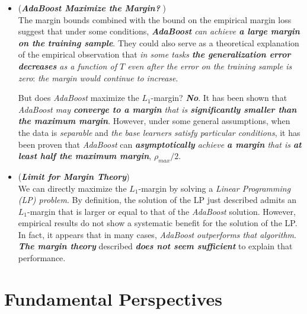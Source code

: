 \documentclass[11pt]{article}
\begin{document}
\begin{itemize}
\item \begin{remark} (\emph{\textbf{AdaBoost Maximize the Margin? }})\\
The margin bounds combined with the bound on the empirical margin loss suggest that under some conditions, \emph{\textbf{AdaBoost} can achieve \textbf{a large margin on the training sample}}. They could also serve as a theoretical explanation of the empirical observation that \emph{in some tasks \textbf{the generalization error decreases} as a function of $T$ even after the error on the training sample is zero}: \emph{the margin would continue to increase}. 

But does \emph{AdaBoost} maximize the $L_1$-margin? \emph{\textbf{No}}. It has been shown that \emph{AdaBoost may \textbf{converge to a margin} that is \textbf{significantly smaller than the maximum margin}}. However, under some general assumptions, when the data is \emph{separable} and \emph{the base learners satisfy particular conditions}, it has been proven that \emph{AdaBoost} can \emph{\textbf{asymptotically} achieve \textbf{a margin} that is \textbf{at least half the maximum margin}}, $\rho_{max}/2$.
\end{remark}

\item \begin{remark} (\emph{\textbf{Limit for Margin Theory}})\\
We can directly maximize the $L_1$-margin by solving a \emph{Linear Programming (LP) problem}. By definition, the solution of the LP just described admits an $L_1$-margin that is larger or equal to that of the \emph{AdaBoost} solution. However, empirical results do not show a systematic benefit for the solution of the LP. In fact, it appears that in many cases, \emph{AdaBoost} \emph{outperforms that algorithm}.  \emph{\textbf{The margin theory}} described \emph{\textbf{does not seem sufficient}} to explain that performance.
\end{remark}
\end{itemize}
\section{Fundamental Perspectives}
\end{document}
